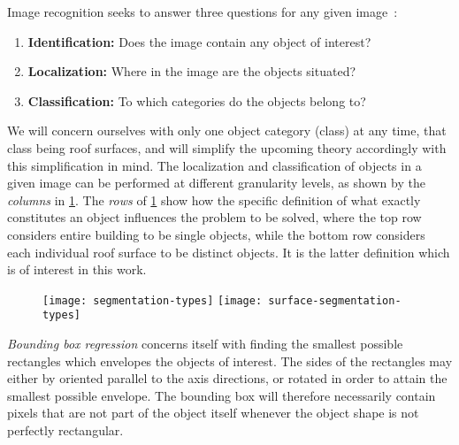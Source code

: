 Image recognition seeks to answer three questions for any given image~\cite{image_recognition}:
%
\begin{enumerate}[]
  \item \textbf{Identification:} Does the image contain any object of interest?
  \item \textbf{Localization:} Where in the image are the objects situated?
  \item \textbf{Classification:} To which categories do the objects belong to?
\end{enumerate}
%
We will concern ourselves with only one object category (class) at any time, that class being roof surfaces, and will simplify the upcoming theory accordingly with this simplification in mind.
The localization and classification of objects in a given image can be performed at different granularity levels, as shown by the \emph{columns} in \cref{fig:segmentation-types}.
The \emph{rows} of \cref{fig:segmentation-types} show how the specific definition of what exactly constitutes an object influences the problem to be solved, where the top row considers entire building to be single objects, while the bottom row considers each individual roof surface to be distinct objects.
It is the latter definition which is of interest in this work.

\begin{figure}[t]
  \texttt{[image: segmentation-types]}
  \texttt{[image: surface-segmentation-types]}
  \label{fig:segmentation-types}
\end{figure}

\textit{Bounding box regression} concerns itself with finding the smallest possible rectangles which envelopes the objects of interest.
The sides of the rectangles may either by oriented parallel to the axis directions, or rotated in order to attain the smallest possible envelope.
The bounding box will therefore necessarily contain pixels that are not part of the object itself whenever the object shape is not perfectly rectangular.

